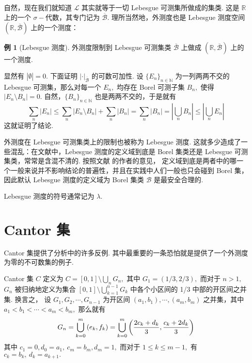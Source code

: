 \documentclass[12pt, a4paper, oneside]{book}
\numberwithin{figure}{section}
\theoremstyle{definition}
\newtheorem{example}[theorem]{例}
\begin{document}
自然，现在我们就知道 $\mathcal L$ 其实就等于一切 Lebesgue 可测集所做成的集类. 这是 $\mathbb R$ 上的一个 $\sigma-$代数，其专门记为 $\overline{\mathcal B}.$ 理所当然地，外测度也是 Lebesgue 测度空间 $(\mathbb R,\overline{\mathcal B})$ 上的一个测度：
\begin{example}[Lebesgue 测度]
    外测度限制到 Lebesgue 可测集类 $\overline{\mathcal B}$ 上做成 $(\mathbb R,\overline{\mathcal B})$ 上的一个测度.
\end{example}

显然有 $|\emptyset|=0.$ 下面证明 $|\cdot|_{\overline{\mathcal B}}$ 的可数可加性. 设 $\{E_n\}_{n\in\mathbb N}$ 为一列两两不交的 Lebesgue 可测集，那么对每一个 $E_n,$ 均存在 Borel 可测子集 $B_n,$ 使得
$|E_n\setminus B_n|=0.$ 自然，$\{B_n\}_{n\in\mathbb N}$ 也是两两不交的，于是就有
\begin{equation}
    \sum_n |E_n|\leq \sum_n |E_n\setminus B_n|+\sum_n |B_n|=\sum_n |B_n|= \left|\bigcup_n B_n\right|\leq \left|\bigcup_n E_n\right|
\end{equation}
这就证明了结论.

外测度在 Lebesgue 可测集类上的限制也被称为 Lebesgue 测度. 这就多少造成了一些混乱：在文献中，Lebesgue 测度的定义域到底是 Borel 集类还是 Lebesgue 可测集类，常常是含混不清的. 按照文献 \cite{Axler_2020} 的作者的意见，
定义域到底是两者中的哪一个一般来说并不影响结论的普遍性，并且在实践中人们一般也只会碰到 Borel 集，因此默认 Lebesgue 测度的定义域为 Borel 集类 $\mathcal B$ 是最安全合理的.

Lebesgue 测度的符号通常记为 $\lambda.$

\section{Cantor 集}

Cantor 集提供了分析中的许多反例. 其中最重要的一条恐怕就是提供了一个外测度为零的不可数集的例子.

Cantor 集 $C$ 定义为 $C=[0,1]\setminus\bigcup_n G_n,$ 其中 $G_1=(1/3,2/3),$ 而对于 $n>1,$ $G_n$ 被归纳地定义为集合 $[0,1]\setminus\bigcup_{k=1}^{n-1} G_k$ 中各个小区间的 1/3 中部的开区间之并集. 换言之，
设 $G_1,G_2,\cdots,G_{n-1}$ 为开区间 $(a_1,b_1),\cdots,(a_m,b_m)$ 之并集，其中 $a_1<b_1<\cdots<a_m<b_m,$ 那么就有
\begin{equation}\label{Cantor set induction def}
    G_n=\bigcup_{k=0}^{m} \left(e_k,f_k\right)=\bigcup_{k=0}^{m} \left({2c_k+d_k\over 3},{c_k+2d_k\over 3}\right)
\end{equation}
其中 $c_1=0, d_0=a_1,\ c_m=b_m, d_{m}=1,$ 而对于 $1\leq k\leq m-1,$ 有 $c_k=b_k,\ d_k=a_{k+1}.$
\end{document}
